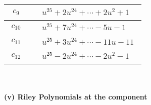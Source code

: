\documentclass[1p]{elsarticle_modified}
\theoremstyle{definition}
\begin{document}
\begin{tabular}{m{50pt}|m{274pt}}
\hline $$\begin{aligned}c_{9}\end{aligned}$$&$\begin{aligned}
&u^{25}+2 u^{24}+\cdots+2 u^2+1
\end{aligned}$\\
\hline $$\begin{aligned}c_{10}\end{aligned}$$&$\begin{aligned}
&u^{25}+7 u^{24}+\cdots-5 u-1
\end{aligned}$\\
\hline $$\begin{aligned}c_{11}\end{aligned}$$&$\begin{aligned}
&u^{25}+3 u^{24}+\cdots-11 u-11
\end{aligned}$\\
\hline $$\begin{aligned}c_{12}\end{aligned}$$&$\begin{aligned}
&u^{25}-2 u^{24}+\cdots-2 u^2-1
\end{aligned}$\\
\hline
\end{tabular}\\~\\
\newpage\renewcommand{\arraystretch}{1}
\flushleft \textbf{(v) Riley Polynomials at the component}\newline \\
\end{document}
